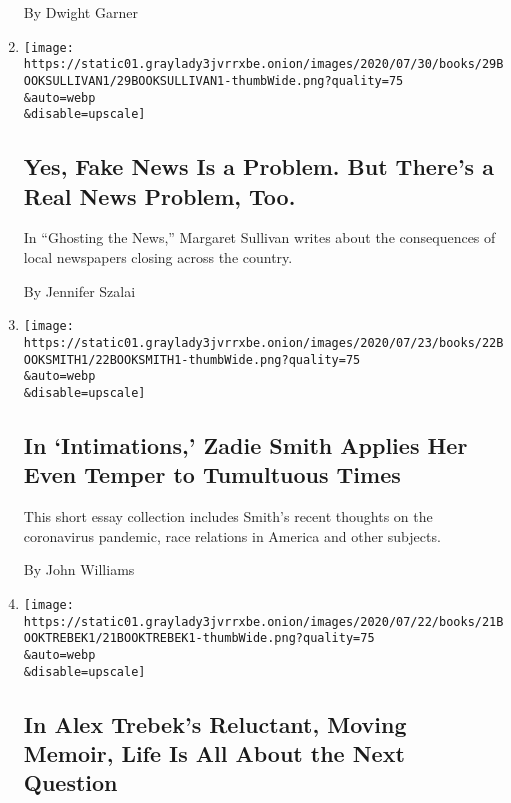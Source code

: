 \begin{enumerate}
  By Dwight Garner
\item
  \href{/2020/07/26/books/review-ghosting-news-local-journalism-democracy-crisis-margaret-sullivan.html}{}

  \texttt{[image: https://static01.graylady3jvrrxbe.onion/images/2020/07/30/books/29BOOKSULLIVAN1/29BOOKSULLIVAN1-thumbWide.png?quality=75\\\&auto=webp\\\&disable=upscale]}

  \hypertarget{yes-fake-news-is-a-problem-but-theres-a-real-news-problem-too}{%
  \subsection{Yes, Fake News Is a Problem. But There's a Real News
  Problem,
  Too.}\label{yes-fake-news-is-a-problem-but-theres-a-real-news-problem-too}}

  In ``Ghosting the News,'' Margaret Sullivan writes about the
  consequences of local newspapers closing across the country.

  By Jennifer Szalai
\item
  \href{/2020/07/22/books/review-intimations-essays-zadie-smith.html}{}

  \texttt{[image: https://static01.graylady3jvrrxbe.onion/images/2020/07/23/books/22BOOKSMITH1/22BOOKSMITH1-thumbWide.png?quality=75\\\&auto=webp\\\&disable=upscale]}

  \hypertarget{in-intimations-zadie-smith-applies-her-even-temper-to-tumultuous-times}{%
  \subsection{In `Intimations,' Zadie Smith Applies Her Even Temper to
  Tumultuous
  Times}\label{in-intimations-zadie-smith-applies-her-even-temper-to-tumultuous-times}}

  This short essay collection includes Smith's recent thoughts on the
  coronavirus pandemic, race relations in America and other subjects.

  By John Williams
\item
  \href{/2020/07/21/books/review-answer-is-alex-trebek-jeopardy-memoir.html}{}

  \texttt{[image: https://static01.graylady3jvrrxbe.onion/images/2020/07/22/books/21BOOKTREBEK1/21BOOKTREBEK1-thumbWide.png?quality=75\\\&auto=webp\\\&disable=upscale]}

  \hypertarget{in-alex-trebeks-reluctant-moving-memoir-life-is-all-about-the-next-question}{%
  \subsection{In Alex Trebek's Reluctant, Moving Memoir, Life Is All
  About the Next
  Question}\label{in-alex-trebeks-reluctant-moving-memoir-life-is-all-about-the-next-question}}


\end{enumerate}

